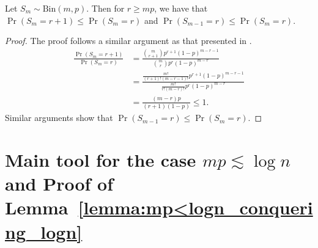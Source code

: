 \begin{lemma}  \label{lemma:binomial_monotonicity}
Let $S_m \sim \mathrm{Bin}(m, p)$. Then for $r \geq mp$, we have that $\Pr(S_m = r + 1) \leq \Pr(S_m = r)$ and \(\Pr(S_{m-1} = r) \leq \Pr(S_{m} = r)\).
\end{lemma}
%
\begin{proof}
The proof follows a similar argument as that presented in \cite{bunke_feller_1969}.  
\begin{align*}
\frac{\Pr(S_m = r + 1)}{\Pr(S_m = r)} &= \frac{ {m \choose r+1} p^{r+1} (1 - p)^{m - r - 1} }{ {m \choose r} p^r (1 - p)^{m - r} } \\
&= \frac{ \frac{m!}{(r + 1)! (m - r - 1)!} p^{r + 1} (1-p)^{m - r - 1}}{ \frac{m!}{r! (m - r)!} p^r (1-p)^{m - r}} \\
&= \frac{(m - r) p }{(r + 1) (1-p)} \leq 1. 
\end{align*}
Similar arguments show that \(\Pr(S_{m-1} = r) \leq \Pr(S_{m} = r)\).
\end{proof}

\section{Main tool for the case \(mp \lesssim \log n\) and Proof of Lemma~\ref{lemma:mp<logn_conquering_logn}}\label{app:geom_alg}

